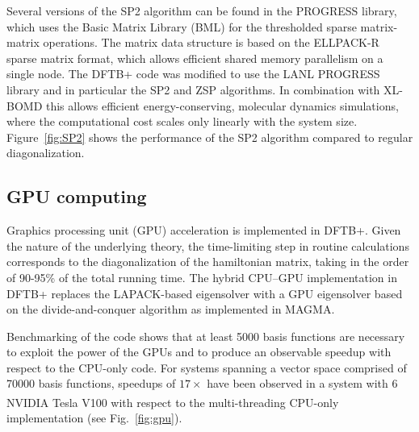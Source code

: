 \documentclass{revtex4-1}
\newcommand{\dftbp}{DFTB+}
\begin{document}
Several versions of the SP2 algorithm can be found in the PROGRESS
library,\cite{niklasson2016progress} which uses the Basic Matrix Library (BML)
\cite{bml,bml2} for the thresholded sparse matrix-matrix operations. The matrix
data structure is based on the ELLPACK-R sparse matrix format, which allows
efficient shared memory parallelism on a single node.\cite{SMniszewski15} The
\dftbp{} code was modified to use the LANL PROGRESS library and in particular
the SP2 and ZSP algorithms. In combination with XL-BOMD this allows efficient
energy-conserving, molecular dynamics simulations, where the computational cost
scales only linearly with the system size. Figure~\ref{fig:SP2} shows the
performance of the SP2 algorithm compared to regular diagonalization.


\subsection{GPU computing}

Graphics processing unit (GPU) acceleration is implemented in \dftbp{}. Given
the nature of the underlying theory, the time-limiting step in routine
calculations corresponds to the diagonalization of the hamiltonian matrix,
taking in the order of 90-95\% of the total running time. The hybrid CPU--GPU
implementation in \dftbp{} replaces the LAPACK-based eigensolver with a GPU
eigensolver based on the divide-and-conquer algorithm as implemented in
MAGMA.\cite{TOMOV2010232}

Benchmarking of the code shows that at least 5000 basis functions are necessary
to exploit the power of the GPUs and to produce an observable speedup with
respect to the CPU-only code. For systems spanning a vector space comprised of
70000 basis functions, speedups of $17\times$ have been observed in a system
with 6 NVIDIA\textsuperscript{\textregistered}
Tesla\textsuperscript{\textregistered} V100 with respect to the multi-threading
CPU-only implementation (see Fig.~\ref{fig:gpu}).
\end{document}
